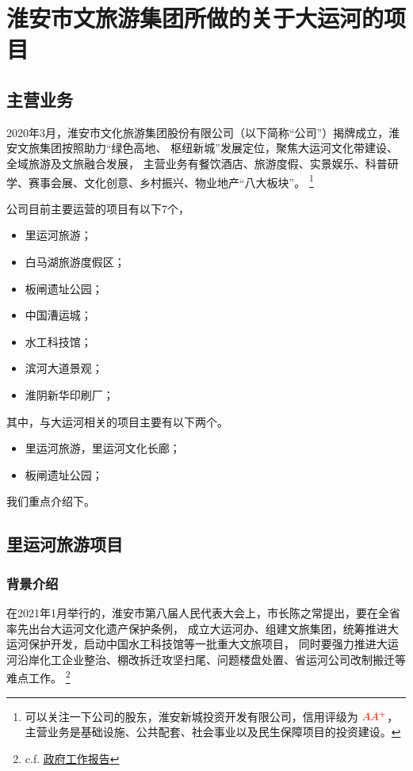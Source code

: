 \documentclass[H:\workspace\担保人财务信息2\杭州大运河\HangZhouText.tex]{subfiles}
\begin{document}
\section{淮安市文旅游集团所做的关于大运河的项目}
\subsection{主营业务}
2020年3月，淮安市文化旅游集团股份有限公司（以下简称“公司”）揭牌成立，淮安文旅集团按照助力“绿色高地、
枢纽新城”发展定位，聚焦大运河文化带建设、全域旅游及文旅融合发展，
主营业务有餐饮酒店、旅游度假、实景娱乐、科普研学、赛事会展、文化创意、乡村振兴、物业地产“八大板块”。
\footnote{可以关注一下公司的股东，淮安新城投资开发有限公司，信用评级为 $\textcolor{red}{AA^{+}}$，
主营业务是基础设施、公共配套、社会事业以及民生保障项目的投资建设。}\par 

公司目前主要运营的项目有以下7个，
\begin{itemize}
    \item 里运河旅游；
    \item 白马湖旅游度假区；
    \item 板闸遗址公园；
    \item 中国漕运城；
    \item 水工科技馆；
    \item 滨河大道景观；
    \item 淮阴新华印刷厂；
\end{itemize}

其中，与大运河相关的项目主要有以下两个。
\begin{itemize}
    \item 里运河旅游，里运河文化长廊；
    \item 板闸遗址公园；
\end{itemize}

我们重点介绍下。
\subsection{里运河旅游项目}
\subsubsection{背景介绍}
在2021年1月举行的，淮安市第八届人民代表大会上，市长陈之常提出，要在全省率先出台大运河文化遗产保护条例，
成立大运河办、组建文旅集团，统筹推进大运河保护开发，启动中国水工科技馆等一批重大文旅项目，
同时要强力推进大运河沿岸化工企业整治、棚改拆迁攻坚扫尾、问题楼盘处置、省运河公司改制搬迁等难点工作。
\footnote{c.f. \href{http://www.hynews.net/p/122726.html}{政府工作报告}}
\end{document}
